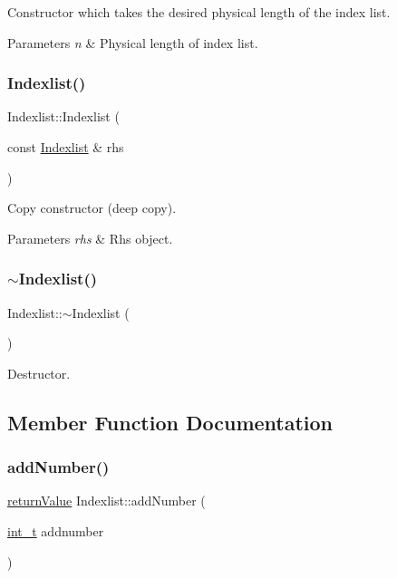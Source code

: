 Constructor which takes the desired physical length of the index list. 
\begin{DoxyParams}{Parameters}
{\em n} & Physical length of index list. \\
\hline
\end{DoxyParams}
\mbox{\label{class_indexlist_ad9e5f23de8e6689e64bb47fa94d54af3}} 
\subsubsection{\texorpdfstring{Indexlist()}{Indexlist()}\hspace{0.1cm}{\footnotesize\ttfamily [3/3]}}
{\footnotesize\ttfamily Indexlist\+::\+Indexlist (\begin{DoxyParamCaption}\item[{const \hyperlink{class_indexlist}{Indexlist} \&}]{rhs }\end{DoxyParamCaption})}

Copy constructor (deep copy). 
\begin{DoxyParams}{Parameters}
{\em rhs} & Rhs object. \\
\hline
\end{DoxyParams}
\mbox{\label{class_indexlist_a25da3346974b3749f54355fc040c6450}} 
\subsubsection{\texorpdfstring{$\sim$\+Indexlist()}{~Indexlist()}}
{\footnotesize\ttfamily Indexlist\+::$\sim$\+Indexlist (\begin{DoxyParamCaption}{ }\end{DoxyParamCaption})}

Destructor. 

\subsection{Member Function Documentation}
\mbox{\label{class_indexlist_a6774029ad3f8b1a1f9b2dd33fea9fcf8}} 
\subsubsection{\texorpdfstring{add\+Number()}{addNumber()}}
{\footnotesize\ttfamily \hyperlink{_message_handling_8hpp_a81d556f613bfbabd0b1f9488c0fa865e}{return\+Value} Indexlist\+::add\+Number (\begin{DoxyParamCaption}\item[{\hyperlink{_types_8hpp_ab6fd6105e64ed14a0c9281326f05e623}{int\+\_\+t}}]{addnumber }\end{DoxyParamCaption})}

